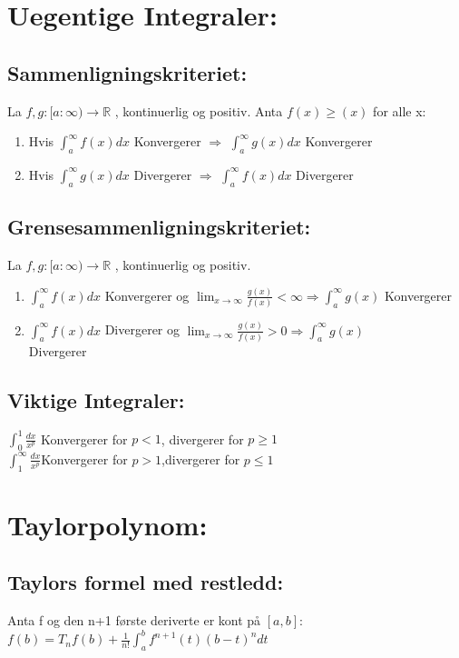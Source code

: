 \documentclass[12pt,a4paper,twocolumn,twoside]{article}
\def\real{\mathbb{R}}
\begin{document}
    \section*{Uegentige Integraler:}
        \subsection*{Sammenligningskriteriet:}
        La $f,g : [a:\infty)\rightarrow \real$ , kontinuerlig og positiv. Anta
        $f(x)\geq(x)$ for alle x:
        \begin{enumerate}[topsep = 0pt,partopsep = 0pt, itemsep = 0cm]
            \item Hvis $\int_a^\infty f(x) dx$ Konvergerer $\Rightarrow$ $\int_a^\infty g(x) dx$ Konvergerer
            \item Hvis $\int_a^\infty g(x) dx$ Divergerer $\Rightarrow$ $\int_a^\infty f(x) dx$ Divergerer
        \end{enumerate}
        \subsection*{Grensesammenligningskriteriet:}
        La $f,g : [a:\infty)\rightarrow \mathbb{R}$ , kontinuerlig og positiv.
        \begin{enumerate}[topsep = 0pt,partopsep = 0pt, itemsep = 0cm]
            \item $\int_a^\infty f(x)dx$ Konvergerer og $\lim_{x\to\infty}\frac{g(x)}{f(x)}<\infty \Rightarrow \int_a^\infty g(x)$ Konvergerer 
            \item $\int_a^\infty f(x)dx$ Divergerer og $\lim_{x\to\infty}\frac{g(x)}{f(x)}>0 \Rightarrow \int_a^\infty g(x)$ \\Divergerer
        \end{enumerate}
        \subsection*{Viktige Integraler:}
        $\int_0^1 \frac{dx}{x^p}$ Konvergerer for $p<1$, divergerer for $p\geq1$\\
        $\int_1^\infty\frac{dx}{x^p}$Konvergerer for $p>1$,divergerer for $p\leq1$\\
    
    \section*{Taylorpolynom:}
        \subsection*{Taylors formel med restledd:}
        Anta f og den n+1 første deriverte er kont på $[a,b]$:\\
        $f(b) = T_n f(b)+\frac{1}{n!}\int_a^b f^{n+1}(t)(b-t)^n dt$
\end{document}
